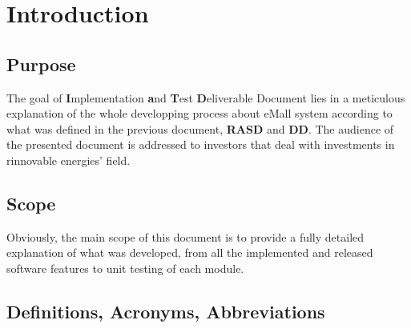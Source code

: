 \chapter{Introduction}
\section{Purpose}
The goal of \textbf{I}mplementation \textbf{a}nd \textbf{T}est \textbf{D}eliverable Document lies in a meticulous explanation of the whole developping process about eMall system according to what was defined in the previous document, \textbf{RASD} and \textbf{DD}.
The audience of the presented document is addressed to investors that deal with investments in rinnovable energies' field.
\section{Scope}
Obviously, the main scope of this document is to provide a fully detailed explanation of what was developed, from all the implemented and released software features to unit testing of each module.
\section{Definitions, Acronyms, Abbreviations}
